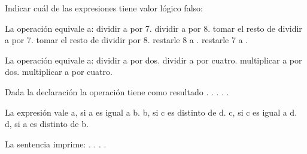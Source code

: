 \question Indicar cuál de las expresiones tiene valor lógico falso:
\choice {}
\choice {}
\correctchoice {}
\choice {}

\question La operación  equivale a:
\choice dividir a  por 7.
\choice dividir a  por 8.
\choice tomar el resto de dividir a  por 7.
\correctchoice tomar el resto de dividir  por 8.
\choice restarle 8 a .
\choice restarle 7 a .

\question La operación  equivale a:
\choice dividir a  por dos.
\correctchoice dividir a  por cuatro.
\choice multiplicar a  por dos.
\choice multiplicar a  por cuatro.

\question Dada la declaración  la operación  tiene como resultado
.
.
.
.
.

\question La expresión  vale
\choice a, si a es igual a b.
\choice b, si c es distinto de d.
\choice c, si c es igual a d.
\correctchoice d, si a es distinto de b.

\question La sentencia  imprime:
.
.
.
.

